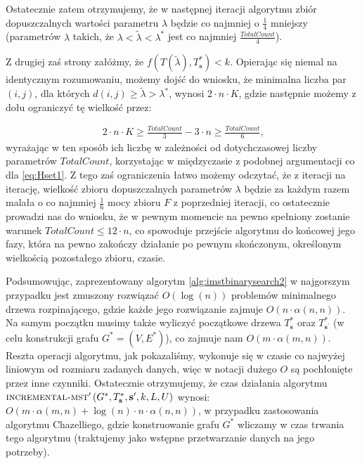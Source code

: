 Ostatecznie zatem otrzymujemy, że w następnej iteracji algorytmu zbiór dopuszczalnych wartości parametru $\lambda$ będzie co najmniej o $\frac{1}{4}$ mniejszy (parametrów $\lambda$ takich, że $\lambda < \tilde{\lambda} < \lambda^{\ast}$ jest co najmniej $\frac{TotalCount}{4}$).

Z drugiej zaś strony załóżmy, że $f \left( T \left( \tilde{\lambda} \right), T^{\ast}_{\textbf{s}} \right) < k$. Opierając się niemal na identycznym rozumowaniu, możemy dojść do wniosku, że minimalna liczba par $\left( i, j \right)$, dla których $d \left( i, j \right) \geqslant \tilde{\lambda} > \lambda^{\ast}$, wynosi $2 \cdot n \cdot K$, gdzie następnie możemy z dołu ograniczyć tę wielkość przez:

\begin{gather*}
	2 \cdot n \cdot K \geqslant \frac{TotalCount}{3} - 3 \cdot n \geqslant \frac{TotalCount}{6}\text{,}
\end{gather*}
wyrażając w ten sposób ich liczbę w zależności od dotychczasowej liczby parametrów $TotalCount$, korzystając w międzyczasie z podobnej argumentacji co dla \ref{eq:Hset1}. Z tego zaś ograniczenia łatwo możemy odczytać, że z iteracji na iterację, wielkość zbioru dopuszczalnych parametrów $\lambda$ będzie za każdym razem malała o co najmniej $\frac{1}{6}$ mocy zbioru $F$ z poprzedniej iteracji, co ostatecznie prowadzi nas do wniosku, że w pewnym momencie na pewno spełniony zostanie warunek $TotalCount \leqslant 12 \cdot n$, co spowoduje przejście algorytmu do końcowej jego fazy, która na pewno zakończy działanie po pewnym skończonym, określonym wielkością pozostałego zbioru, czasie.

Podsumowując, zaprezentowany algorytm \ref{alg:imstbinarysearch2} w najgorszym przypadku jest zmuszony rozwiązać $O \left( \log \left( n \right) \right)$ problemów minimalnego drzewa rozpinającego, gdzie każde jego rozwiązanie zajmuje $O \left( n \cdot \alpha \left( n, n \right) \right)$. Na samym początku musimy także wyliczyć początkowe drzewa $T^{\ast}_{\textbf{s}}$ oraz $T^{\ast}_{\textbf{s}^{\prime}}$ (w celu konstrukcji grafu $G^{\ast} = \left( V, E^{\ast} \right)$), co zajmuje nam $O \left( m \cdot \alpha  \left( m, n \right) \right)$. Reszta operacji algorytmu, jak pokazaliśmy, wykonuje się w czasie co najwyżej liniowym od rozmiaru zadanych danych, więc w notacji dużego $O$ są pochłonięte przez inne czynniki. Ostatecznie otrzymujemy, że czas działania algorytmu $\textsc{incremental-mst}^{\prime} \left( G^{\ast}, T^{\ast}_{\textbf{s}}, \textbf{s}^{\prime}, k, L, U \right)$ wynosi: $O \left( m \cdot \alpha  \left( m, n \right) + \log \left( n \right) \cdot n \cdot \alpha \left( n, n \right) \right)$, w przypadku zastosowania algorytmu Chazelliego, gdzie konstruowanie grafu $G^{\ast}$ wliczamy w czas trwania tego algorytmu (traktujemy jako wstępne przetwarzanie danych na jego potrzeby).

